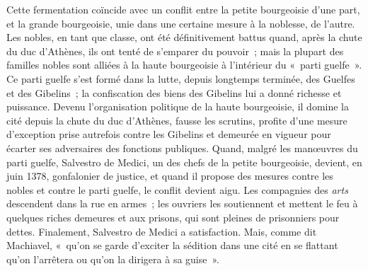 \documentclass[french,twoside]{book} %
\begin{document}
Cette fermentation coïncide avec un conflit entre la petite bourgeoisie d'une part, et la grande bourgeoisie, unie dans une certaine mesure à la nobles­se, de l'autre. Les nobles, en tant que classe, ont été définitivement battus quand, après la chute du duc d'Athènes, ils ont tenté de s'emparer du pouvoir ; mais la plupart des familles nobles sont alliées à la haute bourgeoisie à l'intérieur du « parti guelfe ». Ce parti guelfe s'est formé dans la lutte, depuis longtemps terminée, des Guelfes et des Gibelins ; la confiscation des biens des Gibelins lui a donné richesse et puissance. Devenu l'organisation politique de la haute bourgeoisie, il domine la cité depuis la chute du duc d'Athènes, fausse les scrutins, profite d'une mesure d'exception prise autrefois contre les Gibelins et demeurée en vigueur pour écarter ses adversaires des fonctions publiques. Quand, malgré les manœuvres du parti guelfe, Salvestro de Medici, un des chefs de la petite bourgeoisie, devient, en juin 1378, gonfalonier de justice, et quand il propose des mesures contre les nobles et contre le parti guelfe, le conflit devient aigu. Les compagnies des {\itshape arts} descendent dans la rue en armes ; les ouvriers les soutiennent et mettent le feu à quelques riches demeures et aux prisons, qui sont pleines de prisonniers pour dettes. Finale­ment, Salvestro de Medici a satisfaction. Mais, comme dit Machiavel, « qu'on se garde d'exciter la sédition dans une cité en se flattant qu'on l'arrêtera ou qu'on la dirigera à sa guise ».\par
\end{document}
